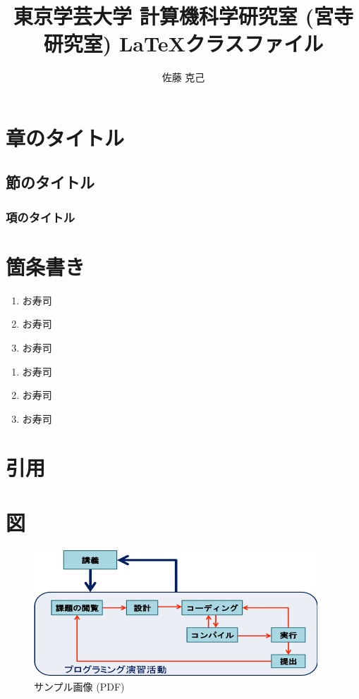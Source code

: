 \documentclass[dvipdfmx]{miyalab}
\title{東京学芸大学 計算機科学研究室 (宮寺研究室) \LaTeX クラスファイル}
\affiliation{宮寺研究室}
\author{佐藤 克己}
\begin{document}
\maketitle

\section{章のタイトル}
\subsection{節のタイトル}
\subsubsection{項のタイトル}

\section{箇条書き}

\begin{enumerate}[labelindent=1\parindent,leftmargin=*,label=第\arabic*位.]
		\item お寿司
		\item お寿司
		\item お寿司
\end{enumerate}

\begin{enumerate}[labelindent=2\parindent,leftmargin=*,label=第\arabic*位.]
		\item お寿司
		\item お寿司
		\item お寿司
\end{enumerate}

\section{引用}

\cite{miyalab-cls}

\cite{latex2e}

\section{図}

\begin{figure}[htbp]
\centering
\includegraphics[width=\linewidth]{image/sample.pdf}
	\caption{サンプル画像 (PDF)}
	\label{fig:sample-pdf}
\end{figure}
\end{document}
